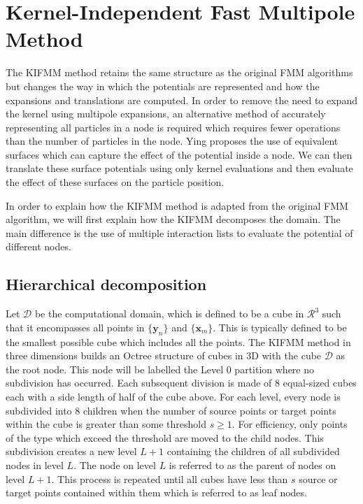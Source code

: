 \FloatBarrier
\section{Kernel-Independent Fast Multipole Method}\label{sec:KIFMM}

The KIFMM method retains the same structure as the original FMM algorithms but changes the way in which the potentials are represented and how the expansions and translations are computed. In order to remove the need to expand the kernel using multipole expansions, an alternative method of accurately representing all particles in a node is required which requires fewer operations than the number of particles in the node. Ying \cite{Ying2004} proposes the use of equivalent surfaces which can capture the effect of the potential inside a node. We can then translate these surface potentials using only kernel evaluations and then evaluate the effect of these surfaces on the particle position.

In order to explain how the KIFMM method is adapted from the original FMM algorithm, we will first explain how the KIFMM decomposes the domain. The main difference is the use of multiple interaction lists to evaluate the potential of different nodes. 

\subsection{Hierarchical decomposition}
Let $\mathcal{D}$ be the computational domain, which is defined to be a cube in $\mathcal{R}^3$ such that it encompasses all points in $\{\bm{y}_n\}$ and $\{\bm{x}_m\}$. This is typically defined to be the smallest possible cube which includes all the points. The KIFMM method in three dimensions builds an Octree structure of cubes in 3D with the cube $\mathcal{D}$ as the root node. This node will be labelled the Level $0$ partition where no subdivision has occurred. Each subsequent division is made of $8$ equal-sized cubes each with a side length of half of the cube above. For each level, every node is subdivided into $8$ children when the number of source points or target points within the cube is greater than some threshold $s\geq 1$. For efficiency, only points of the type which exceed the threshold are moved to the child nodes. This subdivision creates a new level $L+1$ containing the children of all subdivided nodes in level $L$. The node on level $L$ is referred to as the parent of nodes on level $L+1$. This process is repeated until all cubes have less than $s$ source or target points contained within them which is referred to as leaf nodes.


